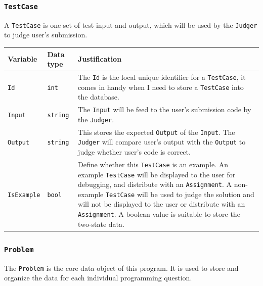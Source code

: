 \documentclass[a4paper]{report}
\begin{document}
\subsubsection{\texttt{TestCase}}

A \texttt{TestCase} is one set of test input and output, which will be used by the \texttt{Judger} to judge user's submission.

\begin{tabulary}{\textwidth}{|l|l|L|}
    \hline
    Variable & Data type & Justification \\
    \hline
    \texttt{Id} & \texttt{int} & The \texttt{Id} is the local unique identifier for a \texttt{TestCase}, it comes in handy when I need to store a \texttt{TestCase} into the database. \\
    \hline
    \texttt{Input} & \texttt{string} & The \texttt{Input} will be feed to the user's submission code by the \texttt{Judger}. \\
    \hline
    \texttt{Output} & \texttt{string} & This stores the expected \texttt{Output} of the \texttt{Input}. The \texttt{Judger} will compare user's output with the \texttt{Output} to judge whether user's code is correct. \\
    \hline
    \texttt{IsExample} & \texttt{bool} & Define whether this \texttt{TestCase} is an example. An example \texttt{TestCase} will be displayed to the user for debugging, and distribute with an \texttt{Assignment}. A non-example \texttt{TestCase} will be used to judge the solution and will not be displayed to the user or distribute with an \texttt{Assignment}. A boolean value is suitable to store the two-state data. \\
    \hline
\end{tabulary}

\subsubsection{\texttt{Problem}}

The \texttt{Problem} is the core data object of this program. It is used to store and organize the data for each individual programming question.
\end{document}
